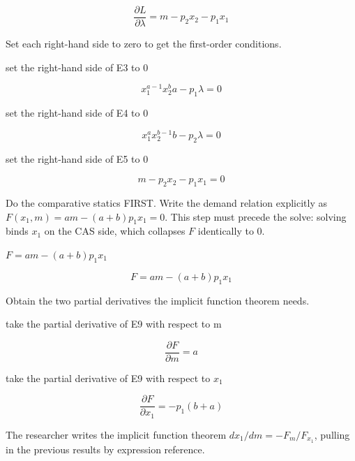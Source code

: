 \documentclass[dvipdfmx]{article}
\begin{document}
\begin{equation}
  \frac{\partial L}{\partial \lambda} = m-p_{2} x_{2}-p_{1} x_{1}
  \label{eq:E5}
\end{equation}

Set each right-hand side to zero to get the first-order conditions.

set the right-hand side of E3 to 0

\begin{equation}
  x_{1}^{a-1} x_{2}^{b} a-p_{1} \lambda = 0
  \label{eq:E6}
\end{equation}

set the right-hand side of E4 to 0

\begin{equation}
  x_{1}^{a} x_{2}^{b-1} b-p_{2} \lambda = 0
  \label{eq:E7}
\end{equation}

set the right-hand side of E5 to 0

\begin{equation}
  m-p_{2} x_{2}-p_{1} x_{1} = 0
  \label{eq:E8}
\end{equation}

Do the comparative statics FIRST. Write the demand relation explicitly as $F(x_1,m)=am-(a+b)p_1x_1=0$. This step must precede the solve: solving binds $x_1$ on the CAS side, which collapses $F$ identically to 0.

$F = a m - (a+b) p_1 x_1$

\begin{equation}
  F = a m - (a+b) p_1 x_1
  \label{eq:E9}
\end{equation}

Obtain the two partial derivatives the implicit function theorem needs.

take the partial derivative of E9 with respect to m

\begin{equation}
  \frac{\partial F}{\partial m} = a
  \label{eq:E10}
\end{equation}

take the partial derivative of E9 with respect to $x_1$

\begin{equation}
  \frac{\partial F}{\partial x_1} = -p_{1} \left(b+a\right)
  \label{eq:E11}
\end{equation}

The researcher writes the implicit function theorem $dx_1/dm=-F_m/F_{x_1}$, pulling in the previous results by expression reference.
\end{document}
